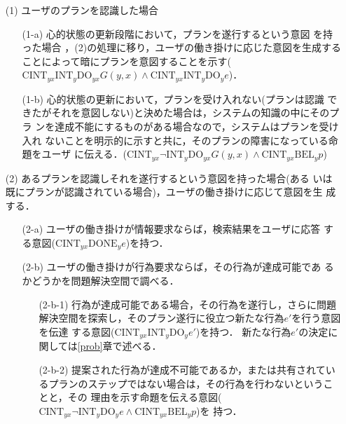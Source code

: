 \begin{enumerate}

\item[(1)] ユーザのプランを認識した場合

\begin{enumerate}

\item[(1-a)] 心的状態の更新段階において，プランを遂行するという意図
を持った場合 ，(2)の処理に移り，ユーザの働き掛けに応じた意図を生成する
ことによって暗にプランを意図することを示す($\mbox{CINT}_{yx}
\mbox{INT}_y \mbox{DO}_{yx} G(y,x) \land \mbox{CINT}_{yx}
\mbox{INT}_y \mbox{DO}_y e$)．

\item[(1-b)] 心的状態の更新において，プランを受け入れない(プランは認識
できたがそれを意図しない)と決めた場合は，システムの知識の中にそのプラ
ンを達成不能にするものがある場合なので，システムはプランを受け入れ
ないことを明示的に示すと共に，そのプランの障害になっている命題をユーザ
に伝える．($\mbox{CINT}_{yx} \lnot \mbox{INT}_y \mbox{DO}_{yx}
G(y,x) \land \mbox{CINT}_{yx} \mbox{BEL}_y p$)

\end{enumerate}

\item[(2)] あるプランを認識しそれを遂行するという意図を持った場合(ある
いは既にプランが認識されている場合)，ユーザの働き掛けに応じて意図を生
成する．

\begin{enumerate}

\item[(2-a)] ユーザの働き掛けが情報要求ならば，検索結果をユーザに応答
する意図($\mbox{CINT}_{yx} \mbox{DONE}_y e$)を持つ．

\item[(2-b)] ユーザの働き掛けが行為要求ならば，その行為が達成可能であ
るかどうかを問題解決空間で調べる．

\begin{enumerate}

\item[(2-b-1)] 行為が達成可能である場合，その行為を遂行し，さらに問題
解決空間を探索し，そのプラン遂行に役立つ新たな行為$e'$を行う意図を伝達
する意図($\mbox{CINT}_{yx} \mbox{INT}_y \mbox{DO}_y e'$)を持つ．
新たな行為$e'$の決定に関しては\ref{prob}章で述べる．

\item[(2-b-2)] 提案された行為が達成不可能であるか，または共有されてい
るプランのステップではない場合は，その行為を行わないということと，その
理由を示す命題を伝える意図($\mbox{CINT}_{yx} \lnot \mbox{INT}_y
\mbox{DO}_y e \land \mbox{CINT}_{yx} \mbox{BEL}_y p$)を
持つ．


\end{enumerate}
\end{enumerate}
\end{enumerate}
